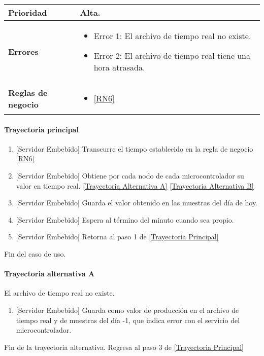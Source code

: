 \begin{longtable}{|J{5cm}|J{10.3cm}|}
	\textbf{Prioridad} & 
		Alta. \\ \hline
	\textbf{Errores} &
		 \begin{itemize}
		 	\item \label{SUB-M-CU1.5:Error1} Error 1: El archivo de tiempo real no existe.
		 	\item \label{SUB-M-CU1.5:Error2} Error 2: El archivo de tiempo real tiene una hora atrasada.
		 \end{itemize} \\ \hline
	\textbf{Reglas de negocio} & 
	    \begin{itemize}
	      \item  \ref{RN6}
		 \end{itemize}\\ \hline
\end{longtable}

\paragraph{Trayectoria principal}
\label{SUB-M-CU1.5:TP}
	\begin{enumerate}
	    \item {[Servidor Embebido]} Transcurre el tiempo establecido en la regla de negocio \ref{RN6}
	    \item {[Servidor Embebido]} Obtiene por cada nodo de cada microcontrolador su valor en tiempo real. \hyperref[SUB-M-CU1.5:TB]{[Trayectoria Alternativa A]} \hyperref[SUB-M-CU1.5:TB]{[Trayectoria Alternativa B]}
	    \item {[Servidor Embebido]} Guarda el valor obtenido en las muestras del día de hoy.
	    \item {[Servidor Embebido]} Espera al término del minuto cuando sea propio.
		\item {[Servidor Embebido]} Retorna al paso 1 de \hyperref[SUB-M-CU1.5:TP]{[Trayectoria Principal]}
	\end{enumerate}
	Fin del caso de uso.

\paragraph{Trayectoria alternativa A} \label{SUB-M-CU1.5:TA}
	El archivo de tiempo real no existe.
	\begin{enumerate}[label=A\arabic*.]
		\item {[Servidor Embebido]} Guarda como valor de producción en el archivo de tiempo real y de muestras del día -1, que indica error con el servicio del microcontrolador.
	\end{enumerate}
	Fin de la trayectoria alternativa. Regresa al paso 3 de \hyperref[SUB-M-CU1.5:TP]{[Trayectoria Principal]}  

